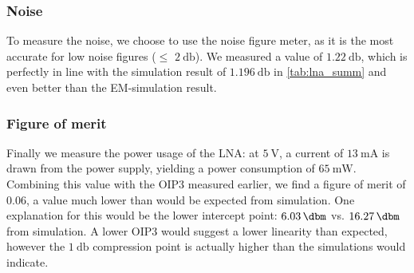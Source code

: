 \documentclass[a4paper]{article}        %
\begin{document}
  \subsubsection{Noise}
  To measure the noise, we choose to use the noise figure meter, as it is the most accurate for low noise figures ($\le$ $\SI{2}{\decibel}$).
  We measured a value of $\SI{1.22}{\decibel}$, which is perfectly in line with the simulation result of $\SI{1.196}{\decibel}$ in \autoref{tab:lna_summ} and even better than the EM-simulation result.

  \subsubsection{Figure of merit}
  Finally we measure the power usage of the LNA: at $\SI{5}{\volt}$, a current of $\SI{13}{\milli\ampere}$ is drawn from the power supply, yielding a power consumption of $\SI{65}{\milli\watt}$.
  Combining this value with the OIP3 measured earlier, we find a figure of merit of $0.06$, a value much lower than would be expected from simulation.
  One explanation for this would be the lower intercept point: $\SI{6.03}{\dbm}$ vs. $\SI{16.27}{\dbm}$ from simulation.
  A lower OIP3 would suggest a lower linearity than expected, however the $\SI{1}{\decibel}$ compression point is actually higher than the simulations would indicate.
\end{document}
